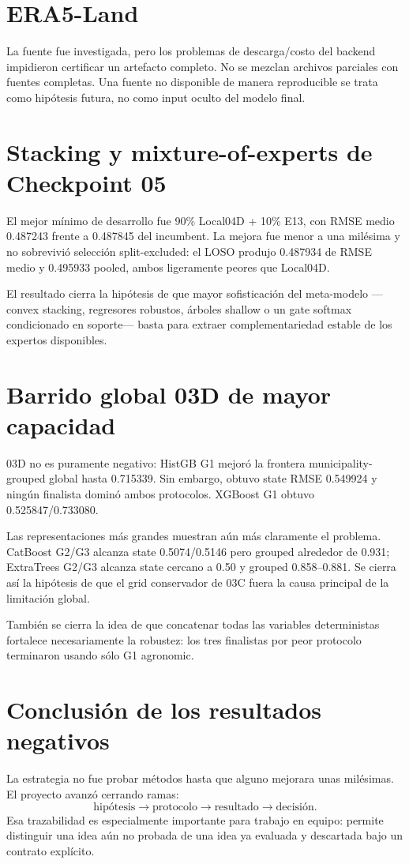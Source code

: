 \section{ERA5-Land}

La fuente fue investigada, pero los problemas de descarga/costo del backend impidieron
certificar un artefacto completo. No se mezclan archivos parciales con fuentes completas. Una
fuente no disponible de manera reproducible se trata como hipótesis futura, no como input
oculto del modelo final.

\section{Stacking y mixture-of-experts de Checkpoint 05}

El mejor mínimo de desarrollo fue 90\% Local04D + 10\% E13, con RMSE medio 0.487243 frente
a 0.487845 del incumbent. La mejora fue menor a una milésima y no sobrevivió selección
split-excluded: el LOSO produjo 0.487934 de RMSE medio y 0.495933 pooled, ambos ligeramente
peores que Local04D.

El resultado cierra la hipótesis de que mayor sofisticación del meta-modelo ---convex
stacking, regresores robustos, árboles shallow o un gate softmax condicionado en soporte---
basta para extraer complementariedad estable de los expertos disponibles.

\section{Barrido global 03D de mayor capacidad}

03D no es puramente negativo: HistGB G1 mejoró la frontera municipality-grouped global hasta
0.715339. Sin embargo, obtuvo state RMSE 0.549924 y ningún finalista dominó ambos protocolos.
XGBoost G1 obtuvo 0.525847/0.733080.

Las representaciones más grandes muestran aún más claramente el problema. CatBoost G2/G3
alcanza state 0.5074/0.5146 pero grouped alrededor de 0.931; ExtraTrees G2/G3 alcanza state
cercano a 0.50 y grouped 0.858--0.881. Se cierra así la hipótesis de que el grid conservador
de 03C fuera la causa principal de la limitación global.

También se cierra la idea de que concatenar todas las variables deterministas fortalece
necesariamente la robustez: los tres finalistas por peor protocolo terminaron usando sólo G1
agronomic.

\section{Conclusión de los resultados negativos}

La estrategia no fue probar métodos hasta que alguno mejorara unas milésimas. El proyecto
avanzó cerrando ramas:
\[
\text{hipótesis}
\rightarrow
\text{protocolo}
\rightarrow
\text{resultado}
\rightarrow
\text{decisión}.
\]
Esa trazabilidad es especialmente importante para trabajo en equipo: permite distinguir una
idea aún no probada de una idea ya evaluada y descartada bajo un contrato explícito.

